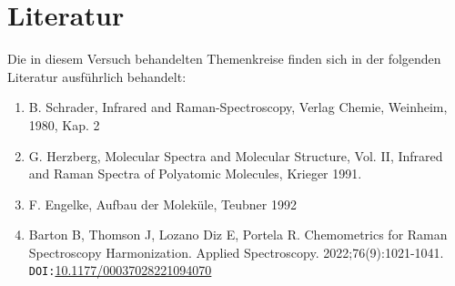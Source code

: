 \section{Literatur}
Die in diesem Versuch behandelten Themenkreise finden sich in der folgenden Literatur ausführlich behandelt:
\begin{enumerate}
    \item B. Schrader, Infrared and Raman-Spectroscopy, Verlag Chemie, Weinheim, 1980, Kap. 2
    \item G. Herzberg, Molecular Spectra and Molecular Structure, Vol. II, Infrared and Raman Spectra of Polyatomic Molecules, Krieger 1991.
    \item F. Engelke, Aufbau der Moleküle, Teubner 1992
    \item Barton B, Thomson J, Lozano Diz E, Portela R. Chemometrics for Raman Spectroscopy Harmonization. Applied Spectroscopy. 2022;76(9):1021-1041.\\
    \texttt{DOI:}\href{https://www.doi.org/10.1177/00037028221094070}{10.1177/00037028221094070}
\end{enumerate}